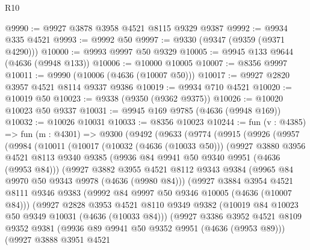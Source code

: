 \begin{lexlean}{R10}
\begin{coremodule}
@9990 := @9927 @3878 @3958 @4521 @8115 @9329 @9387
@9992 := @9934 @335 @4521
@9993 := @9992 @50
@9997 := @9330 (@9347 (@9359 (@9371 @4290)))
@10000 := @9993 @9997 @50 @9329
@10005 := @9945 @133 @9644 (@4636 (@9948 @133))
@10006 := @10000 @10005
@10007 := @8356 @9997
@10011 := @9990 (@10006 (@4636 (@10007 @50)))
@10017 := @9927 @2820 @3957 @4521 @8114 @9337 @9386
@10019 := @9934 @710 @4521
@10020 := @10019 @50
@10023 := @9338 (@9350 (@9362 @9375))
@10026 := @10020 @10023 @50 @9337
@10031 := @9945 @169 @9785 (@4636 (@9948 @169))
@10032 := @10026 @10031
@10033 := @8356 @10023
@10244 := fun (v : @4385) =>
  fun (m : @4301) =>
  @9300
    (@9492
      (@9633
        (@9774
          (@9915
            (@9926
              (@9957
                (@9984
                  (@10011
                    (@10017
                      (@10032 (@4636 (@10033 @50)))
                      (@9927
                        @3880
                        @3956
                        @4521
                        @8113
                        @9340
                        @9385
                        (@9936 @84 @9941 @50 @9340 @9951 (@4636 (@9953 @84)))
                        (@9927
                          @3882
                          @3955
                          @4521
                          @8112
                          @9343
                          @9384
                          (@9965 @84 @9970 @50 @9343 @9978 (@4636 (@9980 @84)))
                          (@9927
                            @3884
                            @3954
                            @4521
                            @8111
                            @9346
                            @9383
                            (@9992 @84 @9997 @50 @9346 @10005 (@4636 (@10007 @84)))
                            (@9927
                              @2828
                              @3953
                              @4521
                              @8110
                              @9349
                              @9382
                              (@10019 @84 @10023 @50 @9349 @10031 (@4636 (@10033 @84)))
                              (@9927
                                @3386
                                @3952
                                @4521
                                @8109
                                @9352
                                @9381
                                (@9936 @89 @9941 @50 @9352 @9951 (@4636 (@9953 @89)))
                                (@9927
                                  @3888
                                  @3951
                                  @4521

\end{coremodule}
\end{lexlean}
